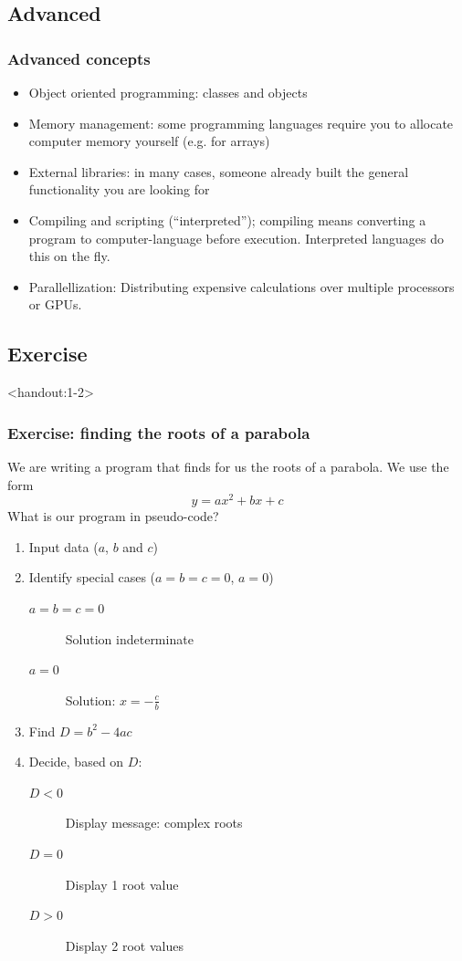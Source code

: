 \subsection*{Advanced}
\begin{frame}
  \frametitle{Advanced concepts}
  \begin{itemize}
    \item Object oriented programming: classes and objects
    \item Memory management: some programming languages require you to allocate computer memory yourself (e.g. for arrays)
    \item External libraries: in many cases, someone already built the general functionality you are looking for
    \item Compiling and scripting (``interpreted''); compiling means converting a program to computer-language before execution. Interpreted languages do this on the fly.
    \item Parallellization: Distributing expensive calculations over multiple processors or GPUs.
  \end{itemize}\pause
 \end{frame}


\subsection*{Exercise}
\begin{frame}<handout:1-2>
  \frametitle{Exercise: finding the roots of a parabola}
  We are writing a program that finds for us the roots of a parabola. We use the form
  \[
    y = ax^2 + bx + c
  \]
  \pause
  What is our program in pseudo-code? \pause
  \begin{enumerate}[<+->]
    \item Input data ($a$, $b$ and $c$)
    \item Identify special cases ($a=b=c=0$, $a=0$)
    \begin{description}
      \item[$a=b=c=0$] Solution indeterminate
      \item[$a=0$] Solution: $x = -\frac{c}{b}$
    \end{description}
    \item Find $D = b^2-4ac$
    \item Decide, based on $D$:
    \begin{description}
      \item[$D<0$] Display message: complex roots
      \item[$D=0$] Display 1 root value
      \item[$D>0$] Display 2 root values
    \end{description}
  \end{enumerate}
\end{frame}

